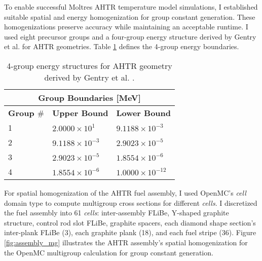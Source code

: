To enable successful Moltres \gls{AHTR} temperature model simulations, I established 
suitable spatial and energy homogenization for group constant generation.
These homogenizations preserve accuracy while maintaining an acceptable runtime.
I used eight precursor groups and a four-group energy structure derived by Gentry et al. 
\cite{gentry_development_2016} for \gls{AHTR} geometries.
Table \ref{tab:energy_structures-bm} defines the 4-group energy boundaries. 
\begin{table}[htbp]
    \centering
    \onehalfspacing
    \caption{4-group energy structures for \acrfull{AHTR} geometry 
    derived by Gentry et al. \cite{gentry_development_2016}.}
	\label{tab:energy_structures-bm}
    \footnotesize
    \begin{tabular}{lll}
    \hline
    \multicolumn{3}{c}{\textbf{Group Boundaries [MeV]}} \\ 
    \hline
    \textbf{Group $\#$}& \textbf{Upper Bound} & \textbf{Lower Bound}  \\
    \hline 
    1 & $2.0000\times 10^1$ & $9.1188\times 10^{-3}$ \\ 
    2 & $9.1188\times 10^{-3}$ & $2.9023\times 10^{-5}$\\
    3 & $2.9023\times 10^{-5}$ & $1.8554\times 10^{-6}$\\
    4 & $1.8554\times 10^{-6}$ & $1.0000\times 10^{-12}$\\
    \hline
    \end{tabular}
\end{table}
For spatial homogenization of the \gls{AHTR} fuel assembly, I used OpenMC's \textit{cell} 
domain type to compute multigroup cross sections for different \textit{cells}.
I discretized the fuel assembly into 61 \textit{cells}: inter-assembly \gls{FLiBe}, Y-shaped 
graphite structure, control rod slot \gls{FLiBe}, graphite spacers, each diamond shape section's 
inter-plank \gls{FLiBe} (3), each graphite plank (18), and each fuel stripe (36).
Figure \ref{fig:assembly_mg} illustrates the \gls{AHTR} assembly's spatial 
homogenization for the OpenMC multigroup calculation for group constant generation.
